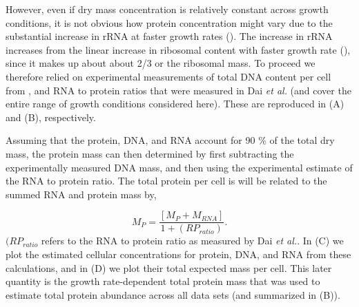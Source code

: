 However, even if dry mass concentration is relatively constant across growth
conditions, it is not obvious how protein concentration might vary due to the
substantial increase in rRNA at faster growth rates (\cite{dai2016}). The
increase in rRNA increases from the linear increase in ribosomal content with
faster growth rate (\cite{scott2010}), since it makes up about about 2/3 or the
ribosomal mass. To proceed we therefore relied on experimental measurements of
total DNA content per cell from \cite{basan2015}, and RNA to protein ratios that
were measured in Dai \textit{et al.} (and cover the entire range of growth
conditions considered here). These are reproduced in
(A) and (B), respectively.

Assuming that the protein, DNA, and RNA account for 90 \% of the total dry mass,
the protein mass can then determined by first subtracting the experimentally
measured DNA mass,  and then using the experimental estimate of the RNA to
protein ratio. The total protein per cell is will be related to the summed RNA
and protein mass by,

\begin{equation}
	M_{P} = \frac{[M_P + M_{RNA}]}{1 + (RP_{ratio})}.
\end{equation}
$(RP_{ratio}$ refers to the RNA to protein ratio as measured by Dai \textit{et
al.}. In (C) we plot the estimated
cellular concentrations for protein, DNA, and RNA from these calculations, and
in (D) we plot their total expected
mass per cell. This later quantity is the growth rate-dependent total protein
mass that was used to estimate total protein abundance across all data sets (and
summarized in (B)).


